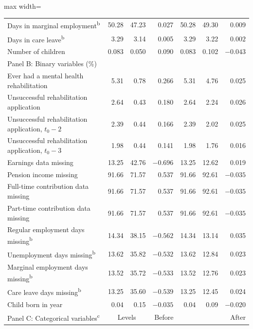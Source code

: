 \documentclass[a4paper,12pt]{article}
\theoremstyle{plain}
\theoremstyle{definition}
\theoremstyle{TheoremNum}
\theoremstyle{CorollaryNum}
\theoremstyle{PropositionNum}
\theoremstyle{TheoremNum}
\begin{document}
\begin{table}[H]
\begin{adjustbox}{max width=\textwidth}
\begin{tabular}{lrrrrrr}
Days in marginal employment\textsuperscript{b} & 50.28 & 47.23 & 0.027 & 50.28 & 49.30 & 0.009 \\
Days in care leave\textsuperscript{b} & 3.29 & 3.14 & 0.005 & 3.29 & 3.22 & $0.002$ \\
Number of children & 0.083 & 0.050 & 0.090 & 0.083 & 0.102 & $-0.043$ \\
\midrule
\multicolumn{7}{l}{Panel B: Binary variables (\%)} \\ \hline
Ever had a mental health rehabilitation & 5.31 & 0.78 & 0.266 & 5.31 & 4.76 & 0.025 \\
Unsuccessful rehabilitation application & 2.64 & 0.43 & 0.180 & 2.64 & 2.24 & 0.026 \\
Unsuccessful rehabilitation application, $t_0-2$ & 2.39 & 0.44 & 0.166 & 2.39 & 2.02 & 0.025 \\
Unsuccessful rehabilitation application, $t_0-3$ & 1.98 & 0.44 & 0.141 & 1.98 & 1.76 & 0.016 \\
Earnings data missing & 13.25 & 42.76 & $-0.696$ & 13.25 & 12.62 & 0.019 \\
Pension income missing & 91.66 & 71.57 & 0.537 & 91.66 & 92.61 & $-0.035$ \\
Full-time contribution data missing & 91.66 & 71.57 & 0.537 & 91.66 & 92.61 & $-0.035$ \\
Part-time contribution data missing & 91.66 & 71.57 & 0.537 & 91.66 & 92.61 & $-0.035$ \\
Regular employment days missing\textsuperscript{b} & 14.34 & 38.15 & $-0.562$ & 14.34 & 13.14 & 0.035 \\
Unemployment days missing\textsuperscript{b} & 13.62 & 35.82 & $-0.532$ & 13.62 & 12.84 & 0.023 \\
Marginal employment days missing\textsuperscript{b} & 13.52 & 35.72 & $-0.533$ & 13.52 & 12.76 & 0.023 \\
Care leave days missing\textsuperscript{b} & 13.25 & 35.60 & $-0.539$ & 13.25 & 12.45 & 0.024 \\
Child born in year & 0.04 & 0.15 & $-0.035$ & 0.04 & 0.09 & $-0.020$ \\
\midrule
Panel C: Categorical variables\textsuperscript{c} & \multicolumn{2}{c}{Levels} & Before & \multicolumn{2}{c}{} & After \\ \hline


\end{tabular}
\end{adjustbox}
\end{table}
\end{document}
